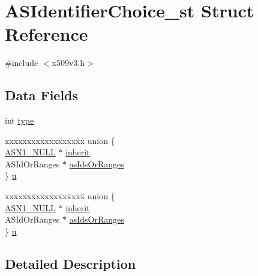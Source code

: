 \hypertarget{struct_a_s_identifier_choice__st}{}\section{A\+S\+Identifier\+Choice\+\_\+st Struct Reference}
\label{struct_a_s_identifier_choice__st}


{\ttfamily \#include $<$x509v3.\+h$>$}

\subsection*{Data Fields}
\begin{DoxyCompactItemize}
\item 
int \hyperlink{struct_a_s_identifier_choice__st_ac765329451135abec74c45e1897abf26}{type}
\item 
\begin{tabbing}
xx\=xx\=xx\=xx\=xx\=xx\=xx\=xx\=xx\=\kill
union \{\\
\>\hyperlink{crypto_2ossl__typ_8h_af03954fbfeac7d608f362307da7c57eb}{ASN1\_NULL} $\ast$ \hyperlink{struct_a_s_identifier_choice__st_aec983f5c76248f78211a9212bdd26548}{inherit}\\
\>ASIdOrRanges $\ast$ \hyperlink{struct_a_s_identifier_choice__st_a00d3c090b8bb3fba5f96ead3056f3cb2}{asIdsOrRanges}\\
\} \hyperlink{struct_a_s_identifier_choice__st_a3bc8bbc23aee93dbaef95e34e7f510b2}{u}\\

\end{tabbing}\item 
\begin{tabbing}
xx\=xx\=xx\=xx\=xx\=xx\=xx\=xx\=xx\=\kill
union \{\\
\>\hyperlink{crypto_2ossl__typ_8h_af03954fbfeac7d608f362307da7c57eb}{ASN1\_NULL} $\ast$ \hyperlink{struct_a_s_identifier_choice__st_aec983f5c76248f78211a9212bdd26548}{inherit}\\
\>ASIdOrRanges $\ast$ \hyperlink{struct_a_s_identifier_choice__st_a00d3c090b8bb3fba5f96ead3056f3cb2}{asIdsOrRanges}\\
\} \hyperlink{struct_a_s_identifier_choice__st_a55463c13d46a8003f9173ba3a3850bfd}{u}\\

\end{tabbing}\end{DoxyCompactItemize}


\subsection{Detailed Description}


